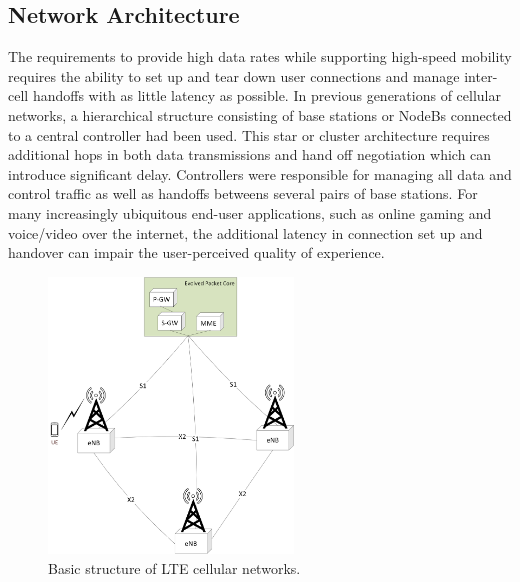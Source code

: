 \subsection{Network Architecture}
\label{net-arch}
The requirements to provide high data rates while supporting high-speed mobility requires the ability to set up and tear down user connections and manage inter-cell handoffs with as little latency as possible.  In previous generations of cellular networks, a hierarchical structure consisting of base stations or NodeBs connected to a central controller had been used.  This star or cluster architecture requires additional hops in both data transmissions and hand off negotiation which can introduce significant delay.  Controllers were responsible for managing all data and control traffic as well as handoffs betweens several pairs of base stations.  For many increasingly ubiquitous end-user applications, such as online gaming and voice/video over the internet, the additional latency in connection set up and handover can impair the user-perceived quality of experience.
\begin{figure}[!ht]
	\centering
	\includegraphics[width=0.58\textwidth]{figs/lteAnet}
	\caption{Basic structure of LTE cellular networks.}
	\label{figs:LTE-A-Network}
\end{figure}


